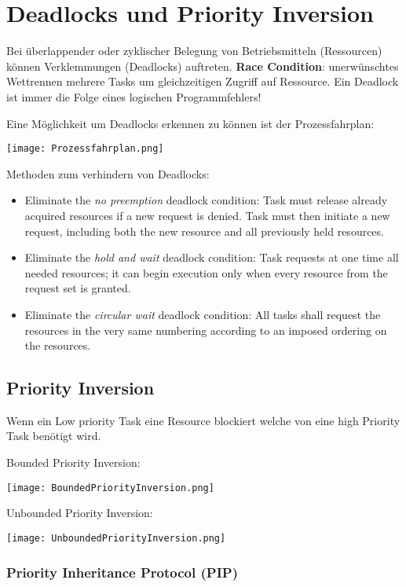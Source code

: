 \section{Deadlocks und Priority Inversion}

Bei überlappender oder zyklischer Belegung von Betriebsmitteln (Ressourcen) können Verklemmungen (Deadlocks) auftreten.
\textbf{Race Condition}: unerwünschtes Wettrennen mehrere Tasks um gleichzeitigen Zugriff auf Ressource.
Ein Deadlock ist immer die Folge eines logischen Programmfehlers!

Eine Möglichkeit um Deadlocks erkennen zu können ist der Prozessfahrplan:

\texttt{[image: Prozessfahrplan.png]}

Methoden zum verhindern von Deadlocks:

\begin{itemize}
    \itemsep-.5em 
    \item Eliminate the \textit{no preemption} deadlock condition: Task must release already acquired resources if a new request is denied. Task must then initiate a new request, including both the new resource and all previously held resources.
    \item Eliminate the \textit{hold and wait} deadlock condition: Task requests at one time all needed resources; it can begin execution only when every resource from the request set is granted.
    \item Eliminate the \textit{circular wait} deadlock condition: All tasks shall request the resources in the very same numbering according to an imposed ordering on the resources.
\end{itemize}


\subsection{Priority Inversion}

Wenn ein Low priority Task eine Resource blockiert welche von eine high Priority Task benötigt wird.

Bounded Priority Inversion:

\texttt{[image: BoundedPriorityInversion.png]}

Unbounded Priority Inversion:

\texttt{[image: UnboundedPriorityInversion.png]}

\subsubsection{Priority Inheritance Protocol (PIP)}

